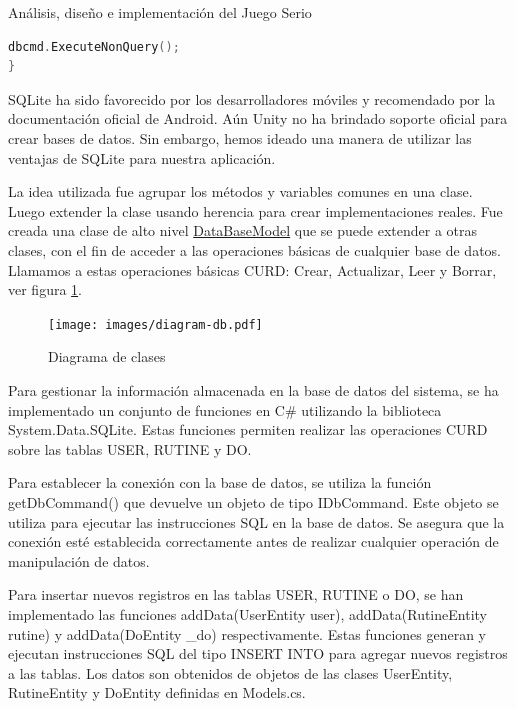 \begin{thesischapter}{2} {Análisis, diseño e implementación del Juego Serio}
\begin{center}
\begin{minipage}{0.8\textwidth}
\begin{lstlisting}[language=c,caption={Sección de código, constructor de la clase CibiofibDb}, label={code: database-code}]
    dbcmd.ExecuteNonQuery();
}
\end{lstlisting}
\end{minipage}
\end{center}
    
\vspace{10pt}
SQLite ha sido favorecido por los desarrolladores móviles y recomendado por la documentación oficial de Android. Aún  
Unity no ha brindado soporte oficial para crear bases de datos. Sin embargo, hemos ideado una manera de utilizar las 
ventajas de SQLite para nuestra aplicación. 

\vspace{10pt}
La idea utilizada fue agrupar los métodos y variables comunes en una clase. Luego extender la clase usando herencia para 
crear implementaciones reales. Fue creada una clase de alto nivel \underline{DataBaseModel} que se puede extender a otras clases, con el 
fin de acceder a las operaciones básicas de cualquier base de datos. Llamamos a estas operaciones básicas CURD: Crear, 
Actualizar, Leer y Borrar, ver figura \ref{fig: diagram-db}.

\begin{figure}[ht]
    \centering
    \texttt{[image: images/diagram-db.pdf]}
    \caption{Diagrama de clases}
    \label{fig: diagram-db}
\end{figure}

Para gestionar la información almacenada en la base de datos del sistema, se ha implementado un conjunto de funciones en C\# utilizando la biblioteca 
System.Data.SQLite. Estas funciones permiten realizar las operaciones CURD sobre las tablas USER, RUTINE y DO.


Para establecer la conexión con la base de datos, se utiliza la función getDbCommand() que devuelve un objeto de tipo IDbCommand. Este objeto se utiliza para ejecutar las instrucciones SQL en 
la base de datos. Se asegura que la conexión esté establecida correctamente antes de realizar cualquier operación de manipulación de datos.

Para insertar nuevos registros en las tablas USER, RUTINE o DO, se han implementado las funciones addData(UserEntity user), addData(RutineEntity rutine) y addData(DoEntity \_do) respectivamente. 
Estas funciones generan y ejecutan instrucciones SQL del tipo INSERT INTO para agregar nuevos registros a las tablas. Los datos son obtenidos de objetos de las clases UserEntity, RutineEntity y DoEntity
definidas en Models.cs.


\end{thesischapter}
